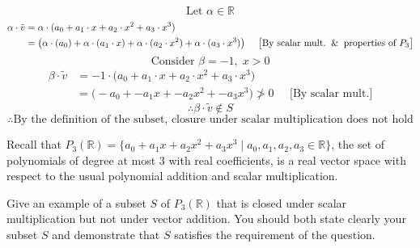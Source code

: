\documentclass[10pt]{article}
\newcommand{\noin}{\noindent}
\begin{document}
{{{\begin{equation}
\end{equation}
\begin{equation}
    \text{Let }\alpha \in \mathbb R
\end{equation}
\begin{align}
    \alpha\cdot \tilde{v} &= \alpha \cdot(a_{0}+a_{1} \cdot x+a_{2} \cdot x^2+a_{3} \cdot x^3)\\
    &=  \big(\alpha \cdot (a_{0})+\alpha \cdot (a_{1} \cdot x)+\alpha \cdot (a_{2} \cdot x^2)+\alpha \cdot (a_{3} \cdot x^3)\big)\;\;\;\;\;\big[\text{By scalar mult.}\And\text{properties of }P_3\big]
\end{align}
\begin{equation*}
\end{equation*}
\begin{equation}
\text{Consider }\beta = -1,\;x>0
\end{equation}
\begin{align}
    \beta\cdot\tilde{v} &= -1\cdot\big(a_{0}+a_{1} \cdot x+a_{2} \cdot x^2+a_{3} \cdot x^3\big)\\
    &=\big(-a_0+-a_1x+-a_2x^2+-a_3x^3\big)\ngtr 0\;\;\;\;\;\big[\text{By scalar mult.}\big]
\end{align}
\begin{equation}
\therefore \beta\cdot \tilde{v} \notin S
\end{equation}
\begin{equation*}
\therefore \text{By the definition of the subset, closure under scalar multiplication does not hold}
\end{equation*}



}

\pagebreak

\noin{\bf 3.} Recall that $P_3(\mathbb R)=\{ a_0+a_1x+a_2x^2+a_3x^3 \mid a_0, a_1, a_2, a_3\in\mathbb R \}$, the set of polynomials of degree at most 3 with real coefficients, is a real vector space with respect to the usual polynomial addition and scalar multiplication. 

\vspace{20pt}

\noin{(b)}  Give an example of a subset $S$ of $P_3(\mathbb R)$ that is closed under scalar multiplication but not under vector addition.  You should both state clearly your subset $S$ and demonstrate that $S$ satisfies the requirement of the question.
    
    
    {
	\vspace*{-10pt}
	
}}}
\end{document}
